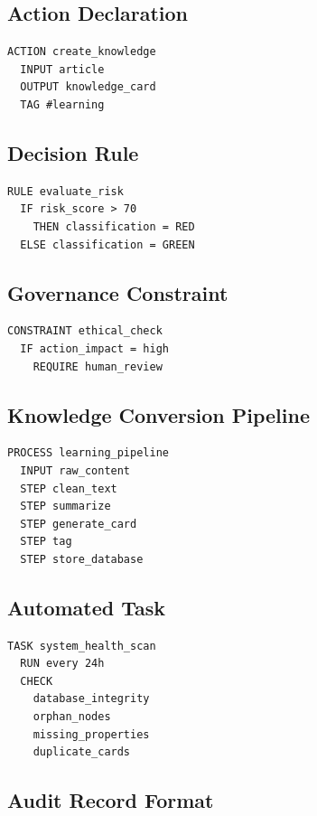\documentclass[conference]{IEEEtran}
\begin{document}
\subsection{Action Declaration}

\begin{verbatim}
ACTION create_knowledge
  INPUT article
  OUTPUT knowledge_card
  TAG #learning
\end{verbatim}

\subsection{Decision Rule}

\begin{verbatim}
RULE evaluate_risk
  IF risk_score > 70
    THEN classification = RED
  ELSE classification = GREEN
\end{verbatim}

\subsection{Governance Constraint}

\begin{verbatim}
CONSTRAINT ethical_check
  IF action_impact = high
    REQUIRE human_review
\end{verbatim}

\subsection{Knowledge Conversion Pipeline}

\begin{verbatim}
PROCESS learning_pipeline
  INPUT raw_content
  STEP clean_text
  STEP summarize
  STEP generate_card
  STEP tag
  STEP store_database
\end{verbatim}

\subsection{Automated Task}

\begin{verbatim}
TASK system_health_scan
  RUN every 24h
  CHECK
    database_integrity
    orphan_nodes
    missing_properties
    duplicate_cards
\end{verbatim}

\subsection{Audit Record Format}
\end{document}
